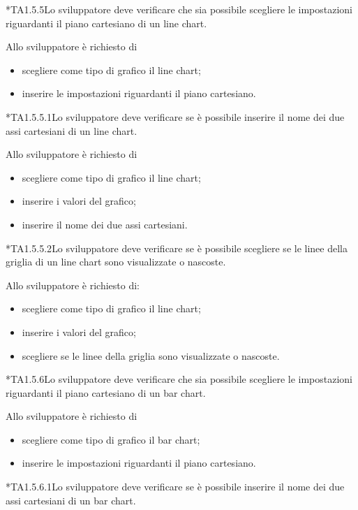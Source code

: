 	*{TA1.5.5}Lo sviluppatore deve verificare che sia possibile scegliere le impostazioni riguardanti il piano cartesiano di un line chart.

		Allo sviluppatore è richiesto di
		\begin{itemize}
			\item scegliere come tipo di grafico il line chart;
			\item inserire le impostazioni riguardanti il piano cartesiano.
		\end{itemize}

	*{TA1.5.5.1}Lo sviluppatore deve verificare se è possibile inserire il nome dei due assi cartesiani di un line chart.

		Allo sviluppatore è richiesto di
		\begin{itemize}
			\item scegliere come tipo di grafico il line chart;
			\item inserire i valori del grafico;
			\item inserire il nome dei due assi cartesiani.
		\end{itemize}

	*{TA1.5.5.2}Lo sviluppatore deve verificare se è possibile scegliere se le linee della griglia di un line chart sono visualizzate o nascoste.

		Allo sviluppatore è richiesto di:
		\begin{itemize}
			\item scegliere come tipo di grafico il line chart;
			\item inserire i valori del grafico;
			\item scegliere se le linee della griglia sono visualizzate o nascoste.
		\end{itemize}

	*{TA1.5.6}Lo sviluppatore deve verificare che sia possibile scegliere le impostazioni riguardanti il piano cartesiano di un bar chart.

		Allo sviluppatore è richiesto di
		\begin{itemize}
			\item scegliere come tipo di grafico il bar chart;
			\item inserire le impostazioni riguardanti il piano cartesiano.
		\end{itemize}

	*{TA1.5.6.1}Lo sviluppatore deve verificare se è possibile inserire il nome dei due assi cartesiani di un bar chart.

